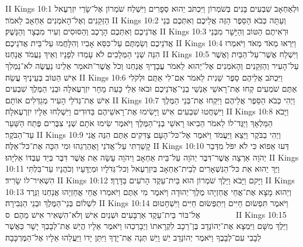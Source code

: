 II Kings 10:1	וּלְאַחְאָב שִׁבְעִים בָּנִים בְּשֹׁמְרוֹן וַיִּכְתֹּב יֵהוּא סְפָרִים וַיִּשְׁלַח שֹׁמְרוֹן אֶל־שָׂרֵי יִזְרְעֶאל הַזְּקֵנִים וְאֶל־הָאֹמְנִים אַחְאָב לֵאמֹר׃
II Kings 10:2	וְעַתָּה כְּבֹא הַסֵּפֶר הַזֶּה אֲלֵיכֶם וְאִתְּכֶם בְּנֵי אֲדֹנֵיכֶם וְאִתְּכֶם הָרֶכֶב וְהַסּוּסִים וְעִיר מִבְצָר וְהַנָּשֶׁק׃
II Kings 10:3	וּרְאִיתֶם הַטּוֹב וְהַיָּשָׁר מִבְּנֵי אֲדֹנֵיכֶם וְשַׂמְתֶּם עַל־כִּסֵּא אָבִיו וְהִלָּחֲמוּ עַל־בֵּית אֲדֹנֵיכֶם׃
II Kings 10:4	וַיִּרְאוּ מְאֹד מְאֹד וַיֹּאמְרוּ הִנֵּה שְׁנֵי הַמְּלָכִים לֹא עָמְדוּ לְפָנָיו וְאֵיךְ נַעֲמֹד אֲנָחְנוּ׃
II Kings 10:5	וַיִּשְׁלַח אֲשֶׁר־עַל־הַבַּיִת וַאֲשֶׁר עַל־הָעִיר וְהַזְּקֵנִים וְהָאֹמְנִים אֶל־יֵהוּא  לֵאמֹר עֲבָדֶיךָ אֲנַחְנוּ וְכֹל אֲשֶׁר־תֹּאמַר אֵלֵינוּ נַעֲשֶׂה לֹא־נַמְלִךְ אִישׁ הַטּוֹב בְּעֵינֶיךָ עֲשֵׂה׃
II Kings 10:6	וַיִּכְתֹּב אֲלֵיהֶם סֵפֶר  שֵׁנִית לֵאמֹר אִם־לִי אַתֶּם וּלְקֹלִי  אַתֶּם שֹׁמְעִים קְחוּ אֶת־רָאשֵׁי אַנְשֵׁי בְנֵי־אֲדֹנֵיכֶם וּבֹאוּ אֵלַי כָּעֵת מָחָר יִזְרְעֶאלָה וּבְנֵי הַמֶּלֶךְ שִׁבְעִים אִישׁ אֶת־גְּדֹלֵי הָעִיר מְגַדְּלִים אוֹתָם׃
II Kings 10:7	וַיְהִי כְּבֹא הַסֵּפֶר אֲלֵיהֶם וַיִּקְחוּ אֶת־בְּנֵי הַמֶּלֶךְ וַיִּשְׁחֲטוּ שִׁבְעִים אִישׁ וַיָּשִׂימוּ אֶת־רָאשֵׁיהֶם בַּדּוּדִים וַיִּשְׁלְחוּ אֵלָיו יִזְרְעֶאלָה׃
II Kings 10:8	וַיָּבֹא הַמַּלְאָךְ וַיַּגֶּד־לוֹ לֵאמֹר הֵבִיאוּ רָאשֵׁי בְנֵי־הַמֶּלֶךְ וַיֹּאמֶר שִׂימוּ אֹתָם שְׁנֵי צִבֻּרִים פֶּתַח הַשַּׁעַר עַד־הַבֹּקֶר׃
II Kings 10:9	וַיְהִי בַבֹּקֶר וַיֵּצֵא וַיַּעֲמֹד וַיֹּאמֶר אֶל־כּל־הָעָם צַדִּקִים אַתֶּם הִנֵּה אֲנִי קָשַׁרְתִּי עַל־אֲדֹנִי וָאֶהְרְגֵהוּ וּמִי הִכָּה אֶת־כּל־אֵלֶּה׃
II Kings 10:10	דְּעוּ אֵפוֹא כִּי לֹא יִפֹּל מִדְּבַר יְהֹוָה אַרְצָה אֲשֶׁר־דִּבֶּר יְהֹוָה עַל־בֵּית אַחְאָב וַיהֹוָה עָשָׂה אֵת אֲשֶׁר דִּבֶּר בְּיַד עַבְדּוֹ אֵלִיָּהוּ׃
II Kings 10:11	וַיַּךְ יֵהוּא אֵת כּל־הַנִּשְׁאָרִים לְבֵית־אַחְאָב בְּיִזְרְעֶאל וְכל־גְּדֹלָיו וּמְיֻדָּעָיו וְכֹהֲנָיו עַד־בִּלְתִּי הִשְׁאִיר־לוֹ שָׂרִיד׃
II Kings 10:12	וַיָּקם וַיָּבֹא וַיֵּלֶךְ שֹׁמְרוֹן הוּא בֵּית־עֵקֶד הָרֹעִים בַּדָּרֶךְ׃
II Kings 10:13	וְיֵהוּא מָצָא אֶת־אֲחֵי אֲחַזְיָהוּ מֶלֶךְ־יְהוּדָה וַיֹּאמֶר מִי אַתֶּם וַיֹּאמְרוּ אֲחֵי אֲחַזְיָהוּ אֲנַחְנוּ וַנֵּרֶד לִשְׁלוֹם בְּנֵי־הַמֶּלֶךְ וּבְנֵי הַגְּבִירָה׃
II Kings 10:14	וַיֹּאמֶר תִּפְשׂוּם חַיִּים וַיִּתְפְּשׂוּם חַיִּים וַיִּשְׁחָטוּם אֶל־בּוֹר בֵּית־עֵקֶד אַרְבָּעִים וּשְׁנַיִם אִישׁ וְלֹא־הִשְׁאִיר אִישׁ מֵהֶם׃ {ס}        
II Kings 10:15	וַיֵּלֶךְ מִשָּׁם וַיִּמְצָא אֶת־יְהוֹנָדָב בֶּן־רֵכָב לִקְרָאתוֹ וַיְבָרְכֵהוּ וַיֹּאמֶר אֵלָיו הֲיֵשׁ אֶת־לְבָבְךָ יָשָׁר כַּאֲשֶׁר לְבָבִי עִם־לְבָבֶךָ וַיֹּאמֶר יְהוֹנָדָב יֵשׁ וָיֵשׁ תְּנָה אֶת־יָדֶךָ וַיִּתֵּן יָדוֹ וַיַּעֲלֵהוּ אֵלָיו אֶל־הַמֶּרְכָּבָה׃
